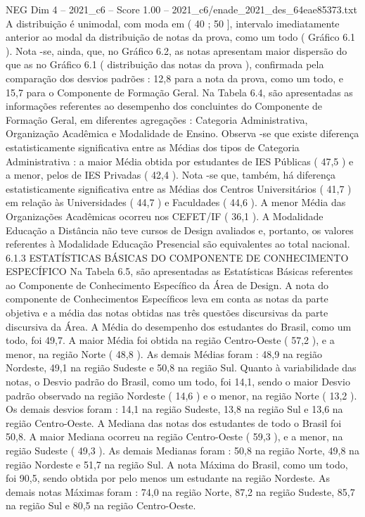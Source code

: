 \begin{textsample}{NEG Dim 4 – 2021\_c6 – Score 1.00 – 2021\_c6/enade\_2021\_des\_64eae85373.txt}
A distribuição é unimodal, com moda em ( 40 ; 50 ], intervalo imediatamente anterior ao modal da distribuição de notas da prova, como um todo ( Gráfico 6.1 ).
Nota -se, ainda, que, no Gráfico 6.2, as notas apresentam maior dispersão do que as no Gráfico 6.1 ( distribuição das notas da prova ), confirmada pela comparação dos desvios padrões : 12,8 para a nota da prova, como um todo, e 15,7 para o Componente de Formação Geral.
Na Tabela 6.4, são apresentadas as informações referentes ao desempenho dos concluintes do Componente de Formação Geral, em diferentes agregações : Categoria Administrativa, Organização Acadêmica e Modalidade de Ensino.
Observa -se que existe diferença estatisticamente significativa entre as Médias dos tipos de Categoria Administrativa : a maior Média obtida por estudantes de IES Públicas ( 47,5 ) e a menor, pelos de IES Privadas ( 42,4 ).
Nota -se que, também, há diferença estatisticamente significativa entre as Médias dos Centros Universitários ( 41,7 ) em relação às Universidades ( 44,7 ) e Faculdades ( 44,6 ).
A menor Média das Organizações Acadêmicas ocorreu nos CEFET/IF ( 36,1 ).
A Modalidade Educação a Distância não teve cursos de Design avaliados e, portanto, os valores referentes à Modalidade Educação Presencial são equivalentes ao total nacional. 6.1.3 ESTATÍSTICAS BÁSICAS DO COMPONENTE DE CONHECIMENTO ESPECÍFICO Na Tabela 6.5, são apresentadas as Estatísticas Básicas referentes ao Componente de Conhecimento Específico da Área de Design.
A nota do componente de Conhecimentos Específicos leva em conta as notas da parte objetiva e a média das notas obtidas nas três questões discursivas da parte discursiva da Área.
A Média do desempenho dos estudantes do Brasil, como um todo, foi 49,7.
A maior Média foi obtida na região Centro-Oeste ( 57,2 ), e a menor, na região Norte ( 48,8 ).
As demais Médias foram : 48,9 na região Nordeste, 49,1 na região Sudeste e 50,8 na região Sul.
Quanto à variabilidade das notas, o Desvio padrão do Brasil, como um todo, foi 14,1, sendo o maior Desvio padrão observado na região Nordeste ( 14,6 ) e o menor, na região Norte ( 13,2 ).
Os demais desvios foram : 14,1 na região Sudeste, 13,8 na região Sul e 13,6 na região Centro-Oeste.
A Mediana das notas dos estudantes de todo o Brasil foi 50,8.
A maior Mediana ocorreu na região Centro-Oeste ( 59,3 ), e a menor, na região Sudeste ( 49,3 ).
As demais Medianas foram : 50,8 na região Norte, 49,8 na região Nordeste e 51,7 na região Sul.
A nota Máxima do Brasil, como um todo, foi 90,5, sendo obtida por pelo menos um estudante na região Nordeste.
As demais notas Máximas foram : 74,0 na região Norte, 87,2 na região Sudeste, 85,7 na região Sul e 80,5 na região Centro-Oeste.

\end{textsample}
